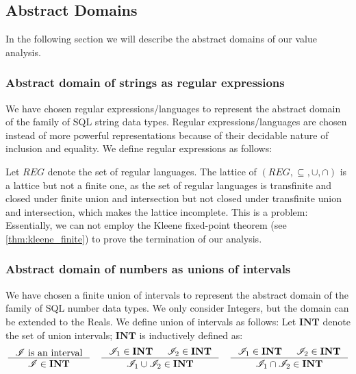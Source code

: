\subsection{Abstract Domains}\label{subsec:abstract-domains}

In the following section we will describe the abstract domains of our value analysis.

\subsubsection{Abstract domain of strings as regular expressions}\label{subsubsec:abstract_domains_strings}
We have chosen regular expressions/languages to represent the abstract domain of the family of SQL string data types.
Regular expressions/languages are chosen instead of more powerful representations because of their decidable nature of inclusion and equality.
We define regular expressions as follows:

Let $REG$ denote the set of regular languages.
The lattice of $(REG, \subseteq, \cup, \cap)$ is a lattice but not a finite one, as the set of regular languages is transfinite and closed under finite union and intersection but not closed under transfinite union and intersection, which makes the lattice incomplete.
This is a problem: Essentially, we can not employ the Kleene fixed-point theorem (see \autoref{thm:kleene_finite}) to prove the termination of our analysis.

\subsubsection{Abstract domain of numbers as unions of intervals}\label{subsubsec:abstract_domains_numbers}
We have chosen a finite union of intervals to represent the abstract domain of the family of SQL number data types.
We only consider Integers, but the domain can be extended to the Reals.
We define union of intervals as follows:
Let $\mathbf{INT}$ denote the set of union intervals; $\mathbf{INT}$ is inductively defined as:
\[
    \inference{\mathscr{I} \text{ is an interval}}{\mathscr{I} \in \mathbf{INT}} \quad
    \inference{\mathscr{I}_1 \in \textbf{INT} & \mathscr{I}_2 \in \textbf{INT}}{\mathscr{I}_1 \cup  \mathscr{I}_2 \in \mathbf{INT}} \quad
    \inference{\mathscr{I}_1 \in \textbf{INT} & \mathscr{I}_2 \in \textbf{INT}}{\mathscr{I}_1 \cap  \mathscr{I}_2 \in \mathbf{INT}}
\]


